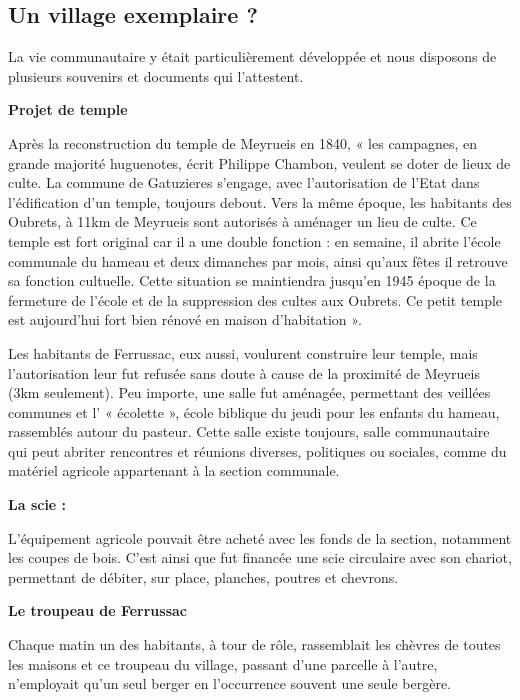 

\subsection*{Un village exemplaire ?}

La vie communautaire y était particulièrement développée et nous disposons de plusieurs souvenirs et
documents qui l’attestent.

\textbf{Projet de temple}

Après la reconstruction du temple de Meyrueis en 1840, « les campagnes, en
grande majorité huguenotes, écrit Philippe Chambon, veulent se doter de lieux de culte. La commune
de Gatuzieres s’engage, avec l’autorisation de l’Etat dans l’édification d’un temple, toujours debout.
Vers la même époque, les habitants des Oubrets, à 11km de Meyrueis sont autorisés à aménager un
lieu de culte. Ce temple est fort original car il a une double fonction : en semaine, il abrite l’école
communale du hameau et deux dimanches par mois, ainsi qu’aux fêtes il retrouve sa fonction cultuelle.
Cette situation se maintiendra jusqu’en 1945 époque de la fermeture de l’école et de la suppression
des cultes aux Oubrets. Ce petit temple est aujourd’hui fort bien rénové en maison d’habitation ».

Les habitants de Ferrussac, eux aussi, voulurent construire leur temple, mais l’autorisation leur fut
refusée sans doute à cause de la proximité de Meyrueis (3km seulement). Peu importe, une salle fut
aménagée, permettant des veillées communes et l’ « écolette », école biblique du jeudi pour les enfants
du hameau, rassemblés autour du pasteur. Cette salle existe toujours, salle communautaire qui peut
abriter rencontres et réunions diverses, politiques ou sociales, comme du matériel agricole appartenant
à la section communale.

\textbf{La scie :}

L’équipement agricole pouvait être acheté avec les fonds de la section, notamment les coupes
de bois. C’est ainsi que fut financée une scie circulaire avec son chariot, permettant de débiter, sur
place, planches, poutres et chevrons.

\textbf{Le troupeau de Ferrussac}

Chaque matin un des habitants, à tour de rôle, rassemblait les chèvres de
toutes les maisons et ce troupeau du village, passant d’une parcelle à l’autre, n’employait qu’un seul
berger en l’occurrence souvent une seule bergère.

